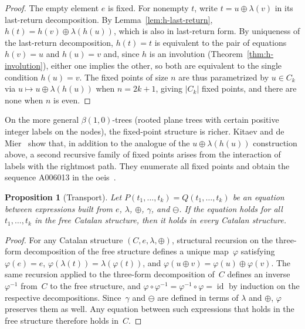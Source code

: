 \documentclass[a4paper,11pt]{article}
\newtheorem{proposition}[theorem]{Proposition}
\theoremstyle{definition}
\newcommand\oeis{{\sc oeis}}
\begin{document}
\begin{proof}
The empty element $e$ is fixed. For nonempty $t$,
write $t = u \oplus \lambda(v)$ in its last-return
decomposition. By Lemma~\ref{lem:h-last-return},
$h(t) = h(v) \oplus \lambda(h(u))$, which is also
in last-return form. By uniqueness of the
last-return decomposition, $h(t) = t$ is equivalent
to the pair of equations $h(v) = u$ and $h(u) = v$ and,
since $h$ is an involution
(Theorem~\ref{thm:h-involution}), either one
implies the other, so both are equivalent to the
single condition $h(u) = v$. The fixed points of
size $n$ are thus parametrized by $u \in C_k$ via
$u \mapsto u \oplus \lambda(h(u))$ when $n = 2k+1$,
giving $|C_k|$ fixed points, and there are none
when $n$ is even.
\end{proof}

On the more general $\beta(1,0)$-trees (rooted plane
trees with certain positive integer labels on the
nodes), the fixed-point structure is richer. Kitaev and de
Mier~\cite{KdM14} show that, in addition to the
analogue of the $u \oplus \lambda(h(u))$ construction
above, a second recursive family of fixed points
arises from the interaction of labels with the
rightmost path. They enumerate all fixed points and
obtain the sequence A006013 in the \oeis~\cite{OEIS}.

\begin{proposition}[Transport]\label{prop:transport}
Let $P(t_1, \ldots, t_k) = Q(t_1, \ldots, t_k)$ be an
equation between expressions built from $e$, $\lambda$,
$\oplus$, $\gamma$, and $\ominus$. If the equation
holds for all $t_1, \ldots, t_k$ in the free Catalan
structure, then it holds in every Catalan structure.
\end{proposition}

\begin{proof}
For any Catalan structure $(C,e,\lambda,\oplus)$,
structural recursion on the three-form decomposition
of the free structure defines a unique map~$\varphi$
satisfying $\varphi(e) = e$,
$\varphi(\lambda(t)) = \lambda(\varphi(t))$, and
$\varphi(u \oplus v) = \varphi(u) \oplus \varphi(v)$.
The same recursion applied to the three-form
decomposition of~$C$ defines an inverse
$\varphi^{-1}$ from~$C$ to the free structure, and
$\varphi \circ \varphi^{-1} = \varphi^{-1} \circ \varphi = \operatorname{id}$
by induction on the respective decompositions.
Since~$\gamma$ and $\ominus$ are defined in terms of
$\lambda$ and $\oplus$, $\varphi$ preserves them as
well. Any equation between such expressions that
holds in the free structure therefore holds in~$C$.
\end{proof}
\end{document}

